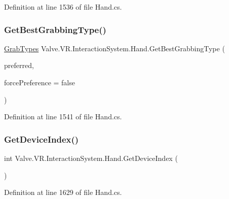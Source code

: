 Definition at line 1536 of file Hand.\+cs.

\mbox{\label{class_valve_1_1_v_r_1_1_interaction_system_1_1_hand_a84aa1ad8bda624c7aeb2375e51f83797}} 
\subsubsection{\texorpdfstring{GetBestGrabbingType()}{GetBestGrabbingType()}\hspace{0.1cm}{\footnotesize\ttfamily [2/2]}}
{\footnotesize\ttfamily \mbox{\hyperlink{namespace_valve_1_1_v_r_1_1_interaction_system_ae03ab84d315f5997fd000817bfb96a0f}{Grab\+Types}} Valve.\+V\+R.\+Interaction\+System.\+Hand.\+Get\+Best\+Grabbing\+Type (\begin{DoxyParamCaption}\item[{\mbox{\hyperlink{namespace_valve_1_1_v_r_1_1_interaction_system_ae03ab84d315f5997fd000817bfb96a0f}{Grab\+Types}}}]{preferred,  }\item[{bool}]{force\+Preference = {\ttfamily false} }\end{DoxyParamCaption})}



Definition at line 1541 of file Hand.\+cs.

\mbox{\label{class_valve_1_1_v_r_1_1_interaction_system_1_1_hand_a247041056841620b9fa58a5fbb0c3fc8}} 
\subsubsection{\texorpdfstring{GetDeviceIndex()}{GetDeviceIndex()}}
{\footnotesize\ttfamily int Valve.\+V\+R.\+Interaction\+System.\+Hand.\+Get\+Device\+Index (\begin{DoxyParamCaption}{ }\end{DoxyParamCaption})}



Definition at line 1629 of file Hand.\+cs.

